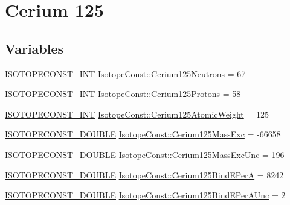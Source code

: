 \hypertarget{group___isotope_const-_cerium-_ce125}{}\section{Cerium 125}
\label{group___isotope_const-_cerium-_ce125}
\subsection*{Variables}
\begin{DoxyCompactItemize}
\item 
\mbox{\hyperlink{group___isotope_const-_macros_ga5f18360b3e99483a35c32d789e62621c}{I\+S\+O\+T\+O\+P\+E\+C\+O\+N\+S\+T\+\_\+\+I\+NT}} \mbox{\hyperlink{group___isotope_const-_cerium-_ce125_ga59fac012cbcdc45c73b0c84cce27584f}{Isotope\+Const\+::\+Cerium125\+Neutrons}} = 67
\item 
\mbox{\hyperlink{group___isotope_const-_macros_ga5f18360b3e99483a35c32d789e62621c}{I\+S\+O\+T\+O\+P\+E\+C\+O\+N\+S\+T\+\_\+\+I\+NT}} \mbox{\hyperlink{group___isotope_const-_cerium-_ce125_gab45f4f811029b6bf47206f36e5932c33}{Isotope\+Const\+::\+Cerium125\+Protons}} = 58
\item 
\mbox{\hyperlink{group___isotope_const-_macros_ga5f18360b3e99483a35c32d789e62621c}{I\+S\+O\+T\+O\+P\+E\+C\+O\+N\+S\+T\+\_\+\+I\+NT}} \mbox{\hyperlink{group___isotope_const-_cerium-_ce125_ga53dd9358a5b4273d587ad5db96b4a88b}{Isotope\+Const\+::\+Cerium125\+Atomic\+Weight}} = 125
\item 
\mbox{\hyperlink{group___isotope_const-_macros_ga8f45a7272ce02c0b4c65c44636ed719a}{I\+S\+O\+T\+O\+P\+E\+C\+O\+N\+S\+T\+\_\+\+D\+O\+U\+B\+LE}} \mbox{\hyperlink{group___isotope_const-_cerium-_ce125_gada492273f1040a5e7ba2136012c7fdeb}{Isotope\+Const\+::\+Cerium125\+Mass\+Exc}} = -\/66658
\item 
\mbox{\hyperlink{group___isotope_const-_macros_ga8f45a7272ce02c0b4c65c44636ed719a}{I\+S\+O\+T\+O\+P\+E\+C\+O\+N\+S\+T\+\_\+\+D\+O\+U\+B\+LE}} \mbox{\hyperlink{group___isotope_const-_cerium-_ce125_ga06c9f7db474cb8a95c45486bd69c9478}{Isotope\+Const\+::\+Cerium125\+Mass\+Exc\+Unc}} = 196
\item 
\mbox{\hyperlink{group___isotope_const-_macros_ga8f45a7272ce02c0b4c65c44636ed719a}{I\+S\+O\+T\+O\+P\+E\+C\+O\+N\+S\+T\+\_\+\+D\+O\+U\+B\+LE}} \mbox{\hyperlink{group___isotope_const-_cerium-_ce125_gae60455daa0b1b877aec7dd8f5821aa26}{Isotope\+Const\+::\+Cerium125\+Bind\+E\+PerA}} = 8242
\item 
\mbox{\hyperlink{group___isotope_const-_macros_ga8f45a7272ce02c0b4c65c44636ed719a}{I\+S\+O\+T\+O\+P\+E\+C\+O\+N\+S\+T\+\_\+\+D\+O\+U\+B\+LE}} \mbox{\hyperlink{group___isotope_const-_cerium-_ce125_gaa1cafba15920489b0ce5f0a566562617}{Isotope\+Const\+::\+Cerium125\+Bind\+E\+Per\+A\+Unc}} = 2

\end{DoxyCompactItemize}
